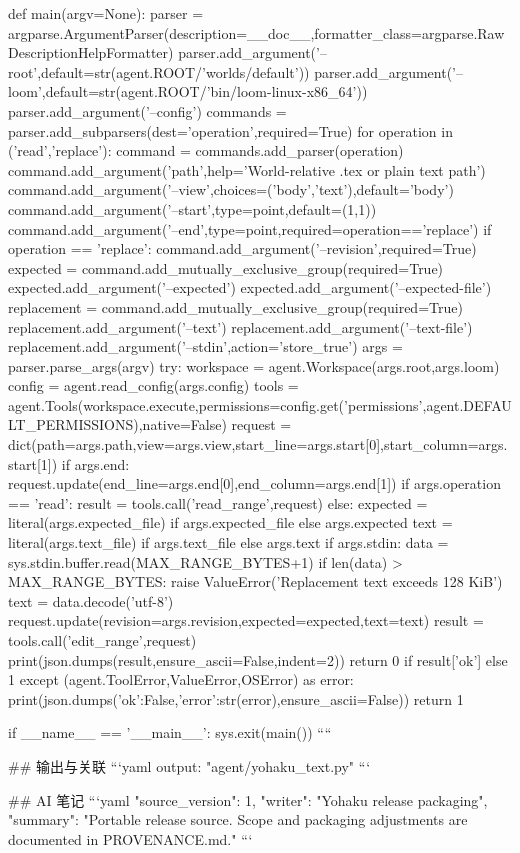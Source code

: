 def main(argv=None):
    parser = argparse.ArgumentParser(description=__doc__,formatter_class=argparse.RawDescriptionHelpFormatter)
    parser.add_argument('--root',default=str(agent.ROOT/'worlds/default'))
    parser.add_argument('--loom',default=str(agent.ROOT/'bin/loom-linux-x86_64'))
    parser.add_argument('--config')
    commands = parser.add_subparsers(dest='operation',required=True)
    for operation in ('read','replace'):
        command = commands.add_parser(operation)
        command.add_argument('path',help='World-relative .tex or plain text path')
        command.add_argument('--view',choices=('body','text'),default='body')
        command.add_argument('--start',type=point,default=(1,1))
        command.add_argument('--end',type=point,required=operation=='replace')
        if operation == 'replace':
            command.add_argument('--revision',required=True)
            expected = command.add_mutually_exclusive_group(required=True)
            expected.add_argument('--expected')
            expected.add_argument('--expected-file')
            replacement = command.add_mutually_exclusive_group(required=True)
            replacement.add_argument('--text')
            replacement.add_argument('--text-file')
            replacement.add_argument('--stdin',action='store_true')
    args = parser.parse_args(argv)
    try:
        workspace = agent.Workspace(args.root,args.loom)
        config = agent.read_config(args.config)
        tools = agent.Tools(workspace.execute,permissions=config.get('permissions',agent.DEFAULT_PERMISSIONS),native=False)
        request = dict(path=args.path,view=args.view,start_line=args.start[0],start_column=args.start[1])
        if args.end:
            request.update(end_line=args.end[0],end_column=args.end[1])
        if args.operation == 'read':
            result = tools.call('read_range',request)
        else:
            expected = literal(args.expected_file) if args.expected_file else args.expected
            text = literal(args.text_file) if args.text_file else args.text
            if args.stdin:
                data = sys.stdin.buffer.read(MAX_RANGE_BYTES+1)
                if len(data) > MAX_RANGE_BYTES:
                    raise ValueError('Replacement text exceeds 128 KiB')
                text = data.decode('utf-8')
            request.update(revision=args.revision,expected=expected,text=text)
            result = tools.call('edit_range',request)
        print(json.dumps(result,ensure_ascii=False,indent=2))
        return 0 if result['ok'] else 1
    except (agent.ToolError,ValueError,OSError) as error:
        print(json.dumps({'ok':False,'error':str(error)},ensure_ascii=False))
        return 1


if __name__ == '__main__':
    sys.exit(main())
````

## 输出与关联
```yaml
output: "agent/yohaku_text.py"
```

## AI 笔记
```yaml
{"source_version": 1, "writer": "Yohaku release packaging", "summary": "Portable release source. Scope and packaging adjustments are documented in PROVENANCE.md."}
```
